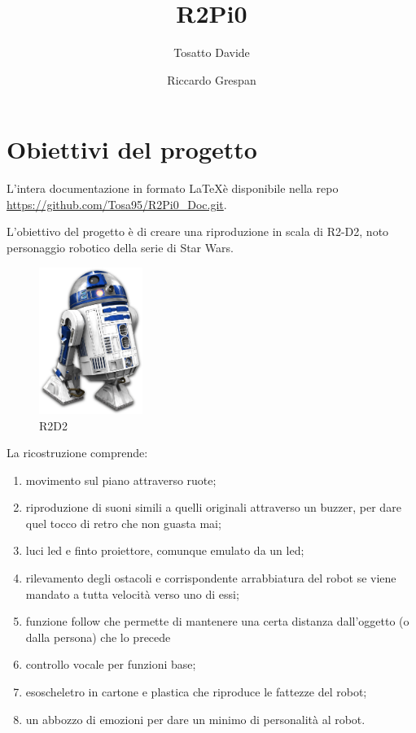 \documentclass[12pt]{article}
\title{R2Pi0}
\author{
  Tosatto Davide
  \and
  Riccardo Grespan
}
\newcommand{\imgsz}{0.3\textwidth}
\begin{document}
 


\maketitle
\newpage
\tableofcontents
\newpage
\section{Obiettivi del progetto}

L'intera documentazione in formato \LaTeX è disponibile nella repo \url{https://github.com/Tosa95/R2Pi0_Doc.git}.

\bigskip

L'obiettivo del progetto è di creare una riproduzione in scala di R2-D2, noto personaggio robotico della serie di Star Wars.

\begin{figure}[h]
\includegraphics[width=\imgsz]{R2D2}
\centering
\caption{R2D2}
\label{fig:R2D2}
\end{figure}

La ricostruzione comprende:
\begin{enumerate}
\item movimento sul piano attraverso ruote;
\item riproduzione di suoni simili a quelli originali attraverso un buzzer, per dare quel tocco di retro che non guasta mai;
\item luci led e finto proiettore, comunque emulato da un led;
\item rilevamento degli ostacoli e corrispondente arrabbiatura del robot se viene mandato a tutta velocità verso uno di essi;
\item funzione follow che permette di mantenere una certa distanza dall'oggetto (o dalla persona) che lo precede
\item controllo vocale per funzioni base;
\item esoscheletro in cartone e plastica che riproduce le fattezze del robot;
\item un abbozzo di emozioni per dare un minimo di personalità al robot.
\end{enumerate}
\end{document}

